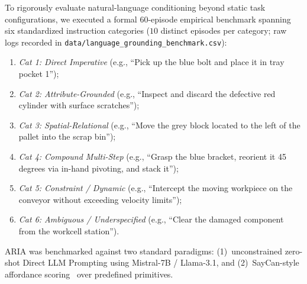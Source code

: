 \documentclass[journal]{IEEEtran}
\begin{document}
To rigorously evaluate natural-language conditioning beyond static task configurations, we executed a formal 60-episode empirical benchmark spanning six standardized instruction categories ($10$ distinct episodes per category; raw logs recorded in \texttt{data/language\_grounding\_benchmark.csv}):
\begin{enumerate}
    \item \textit{Cat 1: Direct Imperative} (e.g., ``Pick up the blue bolt and place it in tray pocket 1'');
    \item \textit{Cat 2: Attribute-Grounded} (e.g., ``Inspect and discard the defective red cylinder with surface scratches'');
    \item \textit{Cat 3: Spatial-Relational} (e.g., ``Move the grey block located to the left of the pallet into the scrap bin'');
    \item \textit{Cat 4: Compound Multi-Step} (e.g., ``Grasp the blue bracket, reorient it 45 degrees via in-hand pivoting, and stack it'');
    \item \textit{Cat 5: Constraint / Dynamic} (e.g., ``Intercept the moving workpiece on the conveyor without exceeding velocity limits'');
    \item \textit{Cat 6: Ambiguous / Underspecified} (e.g., ``Clear the damaged component from the workcell station'').
\end{enumerate}
ARIA was benchmarked against two standard paradigms: (1)~unconstrained zero-shot Direct LLM Prompting using Mistral-7B / Llama-3.1, and (2)~SayCan-style affordance scoring~\cite{aria_054_ahn_2022_do} over predefined primitives.
\end{document}
